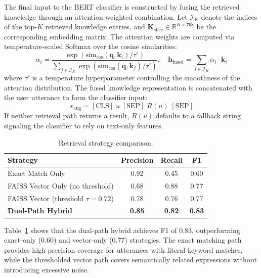 \documentclass[conference]{IEEEtran}
\begin{document}
The final input to the BERT classifier is constructed by fusing the retrieved
knowledge through an attention-weighted combination.
Let $\mathcal{I}_K$ denote the indices of the top-$K$ retrieved knowledge entries,
and $\mathbf{K}_{\text{slice}} \in \mathbb{R}^{K \times 768}$ be the corresponding
embedding matrix. The attention weights are computed via temperature-scaled Softmax
over the cosine similarities:
\begin{equation}
\alpha_i = \frac{\exp(\text{sim}_{\cos}(\mathbf{q}, \mathbf{k}_i) / \tau')}
{\sum_{j \in \mathcal{I}_K} \exp(\text{sim}_{\cos}(\mathbf{q}, \mathbf{k}_j) / \tau')},
\quad
\mathbf{h}_{\text{fused}} = \sum_{i \in \mathcal{I}_K} \alpha_i \cdot \mathbf{k}_i
\label{eq:attention_fusion}
\end{equation}
where $\tau'$ is a temperature hyperparameter controlling the smoothness of the
attention distribution. The fused knowledge representation is concatenated with
the user utterance to form the classifier input:
\begin{equation}
x_{\text{aug}} = [\text{CLS}]\; u \;[\text{SEP}]\; R(u) \;[\text{SEP}]
\label{eq:input_aug}
\end{equation}
If neither retrieval path returns a result, $R(u)$ defaults to a fallback string
signaling the classifier to rely on text-only features.

\begin{table}[H]
\centering
\caption{Retrieval strategy comparison.}
\label{tab:retrieval}
\begin{tabular}{lccc}
\toprule
\textbf{Strategy} & \textbf{Precision} & \textbf{Recall} & \textbf{F1} \\
\midrule
Exact Match Only    & 0.92 & 0.45 & 0.60 \\
FAISS Vector Only (no threshold) & 0.68 & 0.88 & 0.77 \\
FAISS Vector (threshold $\tau=0.72$) & 0.78 & 0.76 & 0.77 \\
\textbf{Dual-Path Hybrid} & \textbf{0.85} & \textbf{0.82} & \textbf{0.83} \\
\bottomrule
\end{tabular}
\end{table}

Table~\ref{tab:retrieval} shows that the dual-path hybrid achieves F1 of 0.83,
outperforming exact-only (0.60) and vector-only (0.77) strategies.
The exact matching path provides high-precision coverage for utterances with
literal keyword matches, while the thresholded vector path covers semantically
related expressions without introducing excessive noise.
\end{document}
